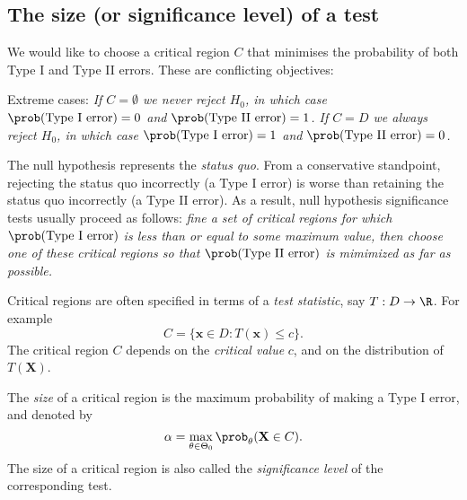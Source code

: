 
\subsection{The size (or significance level) of a test}
We would like to choose a critical region $C$ that minimises the probability of both Type I and Type II errors. These are conflicting objectives:

\vspace*{2ex}
Extreme cases:
\bit
\it If $C=\emptyset$ we \emph{never} reject $H_0$, in which case $\prob(\text{Type I error})=0$ and $\prob(\text{Type II error})=1$.
\it If $C=D$ we \emph{always} reject $H_0$, in which case $\prob(\text{Type I error})=1$ and $\prob(\text{Type II error})=0$.
\eit

\vspace*{2ex}
\begin{remark}
The null hypothesis represents the \textit{status quo}. From a conservative standpoint, rejecting the status quo incorrectly (a Type I error) is worse than retaining the status quo incorrectly (a Type II error). As a result, null hypothesis significance tests usually proceed as follows:
\ben
\it fine a set of critical regions for which $\prob(\text{Type I error})$ is less than or equal to some maximum value, then
\it choose one of these critical regions so that $\prob(\text{Type II error})$ is mimimized as far as possible.
\een
\end{remark}


\begin{remark}
Critical regions are often specified in terms of a \emph{test statistic}, say $T:D\to\R$. For example
\[
C = \{\mathbf{x}\in D : T(\mathbf{x}) \leq c\}.
\]
The critical region $C$ depends on the \emph{critical value} $c$, and on the distribution of $T(\mathbf{X})$.
\end{remark}

\begin{definition}
The \emph{size} of a critical region is the maximum probability of making a Type I error, and denoted by
\[
\alpha = \max_{\theta\in\Theta_0} \prob_{\theta}(\mathbf{X}\in C).
\]
The size of a critical region is also called the \emph{significance level} of the corresponding test.
\end{definition}


